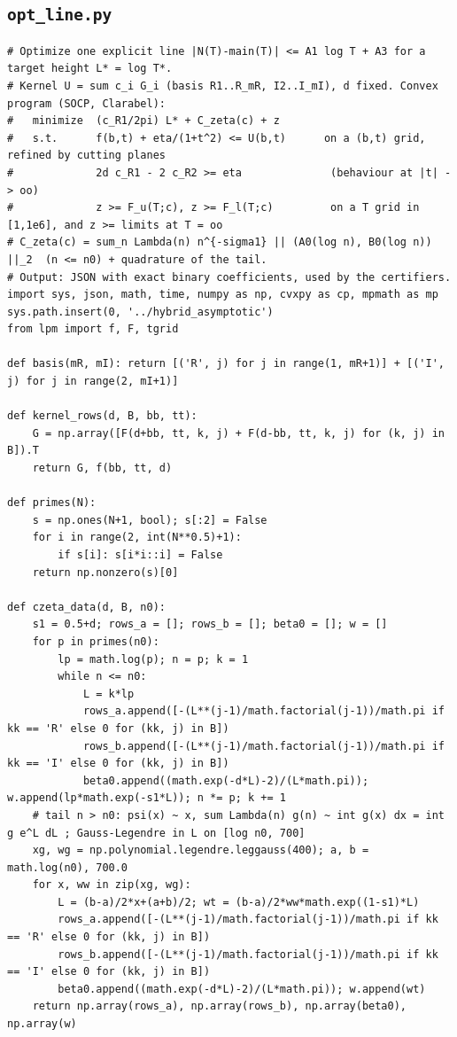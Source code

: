 \documentclass[11pt,reqno]{amsart}
\numberwithin{equation}{section}
\theoremstyle{definition}
\theoremstyle{remark}
\begin{document}
\subsection*{\texttt{opt\_line.py}}
\begin{lstlisting}
# Optimize one explicit line |N(T)-main(T)| <= A1 log T + A3 for a target height L* = log T*.
# Kernel U = sum c_i G_i (basis R1..R_mR, I2..I_mI), d fixed. Convex program (SOCP, Clarabel):
#   minimize  (c_R1/2pi) L* + C_zeta(c) + z
#   s.t.      f(b,t) + eta/(1+t^2) <= U(b,t)      on a (b,t) grid, refined by cutting planes
#             2d c_R1 - 2 c_R2 >= eta              (behaviour at |t| -> oo)
#             z >= F_u(T;c), z >= F_l(T;c)         on a T grid in [1,1e6], and z >= limits at T = oo
# C_zeta(c) = sum_n Lambda(n) n^{-sigma1} || (A0(log n), B0(log n)) ||_2  (n <= n0) + quadrature of the tail.
# Output: JSON with exact binary coefficients, used by the certifiers.
import sys, json, math, time, numpy as np, cvxpy as cp, mpmath as mp
sys.path.insert(0, '../hybrid_asymptotic')
from lpm import f, F, tgrid

def basis(mR, mI): return [('R', j) for j in range(1, mR+1)] + [('I', j) for j in range(2, mI+1)]

def kernel_rows(d, B, bb, tt):
    G = np.array([F(d+bb, tt, k, j) + F(d-bb, tt, k, j) for (k, j) in B]).T
    return G, f(bb, tt, d)

def primes(N):
    s = np.ones(N+1, bool); s[:2] = False
    for i in range(2, int(N**0.5)+1):
        if s[i]: s[i*i::i] = False
    return np.nonzero(s)[0]

def czeta_data(d, B, n0):
    s1 = 0.5+d; rows_a = []; rows_b = []; beta0 = []; w = []
    for p in primes(n0):
        lp = math.log(p); n = p; k = 1
        while n <= n0:
            L = k*lp
            rows_a.append([-(L**(j-1)/math.factorial(j-1))/math.pi if kk == 'R' else 0 for (kk, j) in B])
            rows_b.append([-(L**(j-1)/math.factorial(j-1))/math.pi if kk == 'I' else 0 for (kk, j) in B])
            beta0.append((math.exp(-d*L)-2)/(L*math.pi)); w.append(lp*math.exp(-s1*L)); n *= p; k += 1
    # tail n > n0: psi(x) ~ x, sum Lambda(n) g(n) ~ int g(x) dx = int g e^L dL ; Gauss-Legendre in L on [log n0, 700]
    xg, wg = np.polynomial.legendre.leggauss(400); a, b = math.log(n0), 700.0
    for x, ww in zip(xg, wg):
        L = (b-a)/2*x+(a+b)/2; wt = (b-a)/2*ww*math.exp((1-s1)*L)
        rows_a.append([-(L**(j-1)/math.factorial(j-1))/math.pi if kk == 'R' else 0 for (kk, j) in B])
        rows_b.append([-(L**(j-1)/math.factorial(j-1))/math.pi if kk == 'I' else 0 for (kk, j) in B])
        beta0.append((math.exp(-d*L)-2)/(L*math.pi)); w.append(wt)
    return np.array(rows_a), np.array(rows_b), np.array(beta0), np.array(w)


\end{lstlisting}
\end{document}
